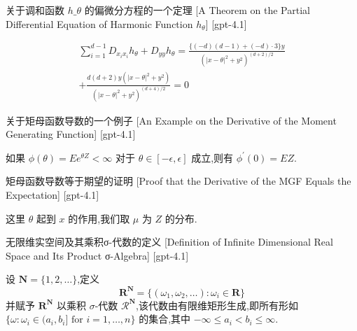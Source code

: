 \documentclass[UTF8]{ctexart}
\begin{document}
    
    
    \begin{thm}
        {关于调和函数 $h\_\theta$ 的偏微分方程的一个定理}
        [A Theorem on the Partial Differential Equation of Harmonic Function $h_\theta$]
        [gpt-4.1]
        
\[
\begin{array}{r}
{\displaystyle \sum_{i=1}^{d-1} D_{x_{i}x_{i}} h_{\theta} + D_{yy} h_{\theta} = \frac{ \{ (-d)(d-1) + (-d) \cdot 3 \} y }{ (|x-\theta|^{2} + y^{2})^{(d+2)/2} } } \\
{ + \frac{ d(d+2) y (|x-\theta|^{2} + y^{2}) }{ (|x-\theta|^{2} + y^{2})^{(d+4)/2} } = 0 }
\end{array}
\]

    \end{thm}
    
    
    
    \begin{xmp}
        {关于矩母函数导数的一个例子}
        [An Example on the Derivative of the Moment Generating Function]
        [gpt-4.1]
        
如果 $\phi(\theta) = E e^{\theta Z} < \infty$ 对于 $\theta \in [ -\epsilon, \epsilon ]$ 成立,则有 $\phi^{\prime}(0) = E Z$.

    \end{xmp}
    
    
    
    \begin{prf}
        {矩母函数导数等于期望的证明}
        [Proof that the Derivative of the MGF Equals the Expectation]
        [gpt-4.1]
        
这里 $\theta$ 起到 $x$ 的作用,我们取 $\mu$ 为 $Z$ 的分布.

    \end{prf}
    
    
    
    \begin{dfn}
        {无限维实空间及其乘积σ-代数的定义}
        [Definition of Infinite Dimensional Real Space and Its Product σ-Algebra]
        [gpt-4.1]
        
设 $\mathbf{N} = \{ 1, 2, \ldots \}$,定义
\[
\mathbf{R}^{\mathbf{N}} = \{ (\omega_{1}, \omega_{2}, \ldots) : \omega_{i} \in \mathbf{R} \}
\]
并赋予 $\mathbf{R}^{\mathbf{N}}$ 以乘积 $\sigma$-代数 $\mathcal{R}^{\mathbf{N}}$,该代数由有限维矩形生成,即所有形如 $\{ \omega : \omega_{i} \in (a_{i}, b_{i}] \text{ for } i = 1, \ldots, n \}$ 的集合,其中 $-\infty \leq a_{i} < b_{i} \leq \infty$.

    \end{dfn}
    
\end{document}
